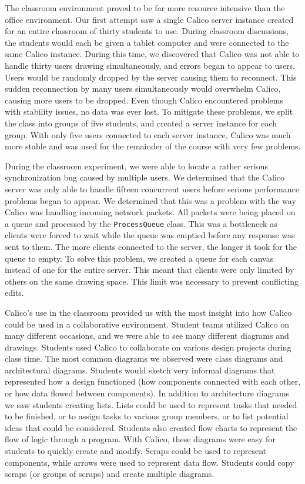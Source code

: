 The classroom environment proved to be far more resource intensive than the office environment. Our first attempt saw a single Calico server instance created for an entire classroom of thirty students to use. During classroom discussions, the students would each be given a tablet computer and were connected to the same Calico instance. During this time, we discovered that Calico was not able to handle thirty users drawing simultaneously, and errors began to appear to users. Users would be randomly dropped by the server causing them to reconnect. This sudden reconnection by many users simultaneously would overwhelm Calico, causing more users to be dropped. Even though Calico encountered problems with stability issues, no data was ever lost. To mitigate these problems, we split the class into groups of five students, and created a server instance for each group. With only five users connected to each server instance, Calico was much more stable and was used for the remainder of the course with very few problems.

During the classroom experiment, we were able to locate a rather serious synchronization bug caused by multiple users. We determined that the Calico server was only able to handle fifteen concurrent users before serious performance problems began to appear. We determined that this was a problem with the way Calico was handling incoming network packets. All packets were being placed on a queue and processed by the \texttt{ProcessQueue} class. This was a bottleneck as clients were forced to wait while the queue was emptied before any response was sent to them. The more clients connected to the server, the longer it took for the queue to empty. To solve this problem, we created a queue for each canvas instead of one for the entire server. This meant that clients were only limited by others on the same drawing space. This limit was necessary to prevent conflicting edits.

Calico's use in the classroom provided us with the most insight into how Calico could be used in a collaborative environment. Student teams utilized Calico on many different occasions, and we were able to see many different diagrams and drawings. Students used Calico to collaborate on various design projects during class time. The most common diagrams we observed were class diagrams and architectural diagrams. Students would sketch very informal diagrams that represented how a design functioned (how components connected with each other, or how data flowed between components). In addition to architecture diagrams we saw students creating lists. Lists could be used to represent tasks that needed to be finished, or to assign tasks to various group members, or to list potential ideas that could be considered. Students also created flow charts to represent the flow of logic through a program. With Calico, these diagrams were easy for students to quickly create and modify. Scraps could be used to represent components, while arrows were used to represent data flow. Students could copy scraps (or groups of scraps) and create multiple diagrams.

